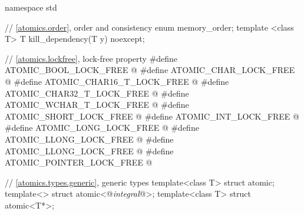 %
\begin{codeblock}
namespace std {
  // \ref{atomics.order}, order and consistency
  enum memory_order;
  template <class T>
    T kill_dependency(T y) noexcept;

  // \ref{atomics.lockfree}, lock-free property
  #define ATOMIC_BOOL_LOCK_FREE @\unspec@
  #define ATOMIC_CHAR_LOCK_FREE @\unspec@
  #define ATOMIC_CHAR16_T_LOCK_FREE @\unspec@
  #define ATOMIC_CHAR32_T_LOCK_FREE @\unspec@
  #define ATOMIC_WCHAR_T_LOCK_FREE @\unspec@
  #define ATOMIC_SHORT_LOCK_FREE @\unspec@
  #define ATOMIC_INT_LOCK_FREE @\unspec@
  #define ATOMIC_LONG_LOCK_FREE @\unspec@
  #define ATOMIC_LLONG_LOCK_FREE @\unspec@
  #define ATOMIC_LLONG_LOCK_FREE @\unspec@
  #define ATOMIC_POINTER_LOCK_FREE @\unspec@

  // \ref{atomics.types.generic}, generic types
  template<class T> struct atomic;
  template<> struct atomic<@\textit{integral}@>;
  template<class T> struct atomic<T*>;

}
\end{codeblock}
